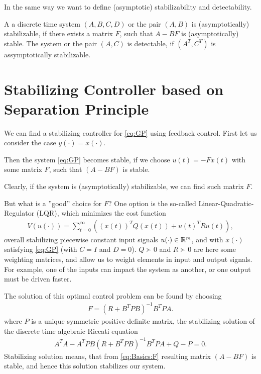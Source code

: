 In the same way we want to define (asymptotic) stabilizability and detectability. 
\begin{defi}
A a discrete time system $(A, B, C, D)$ or the pair $(A, B)$ is (asymptotically) stabilizable, if there exists a matrix $F$, such that $A - BF$ is (asymptotically) stable.
The system or the pair $(A,C)$ is detectable, if $(A^T, C^T)$ is assymptotically stabilizable. 
\end{defi}



\section{Stabilizing Controller based on Separation Principle}
\label{sch:stabilizingController}



We can find a stabilizing controller for \eqref{eq:GP} using feedback control.
First let us consider the case $y(\cdot) = x(\cdot)$.

%
%

Then the system \eqref{eq:GP} becomes stable, if we choose $u(t) = -Fx(t)$ with some matrix $F$, such that $(A - BF)$ is stable.

Clearly, if the system is (asymptotically) stabilizable, we can find such matrix $F$. 

But what is a ''good'' choice for $F$? One option is the so-called Linear-Quadratic-Regulator (LQR), which minimizes the cost function 
\begin{align}
\label{eq:costFcn}
V(u(\cdot)) = \sum_{t = 0}^\infty \left( (x(t))^T Q (x(t)) + u(t)^T R u(t)\right),
\end{align}
overall stabilizing piecewise constant input signals $u(\cdot) \in {\mathbb{R}}^m$, and with $x(\cdot)$ satisfying \eqref{eq:GP} (with $C = I$ and $D = 0$). 
$Q \succ 0$ and $R \succ 0$ are here some weighting matrices, and allow us  to weight elements in input and output signals. For example, one of the inputs can impact the system as another, or one output must be driven faster. 

The solution of this optimal control problem can be found by choosing 
\begin{align}
\label{eq:Basics:F}
F = (R + B^T P B)^{-1}B^TPA.
\end{align}
where $P$ is a unique symmetric positive definite matrix, the stabilizing solution of the discrete time algebraic Riccati equation
\begin{align}
 A^TA - A^T P B (R + B^T P B)^{-1} B^T P A + Q - P = 0.%
\end{align}
Stabilizing solution means, that from \eqref{eq:Basics:F} resulting matrix $(A - BF)$ is stable, and hence this solution stabilizes our system. 




